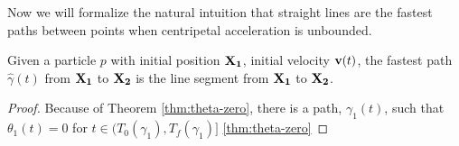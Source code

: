 Now we will formalize the natural intuition that straight lines are the fastest paths between points when centripetal acceleration is unbounded.

\begin{theorem}\label{thm:line-proof}
  Given a particle $p$ with initial position $\mathbf{X_1}$, initial velocity $\mathbf{v}(t)$, the fastest path $\hat{\gamma}(t)$ from $\mathbf{X_1}$ to $\mathbf{X_2}$ is the line segment from $\mathbf{X_1}$ to $\mathbf{X_2}$.
\end{theorem}

\begin{proof}
  Because of Theorem \ref{thm:theta-zero}, there is a path, $\gamma_1(t)$, such that $\theta_1(t) = 0$ for $t \in (T_0(\gamma_1), T_f(\gamma_1)]$ \ref{thm:theta-zero}

\end{proof}







